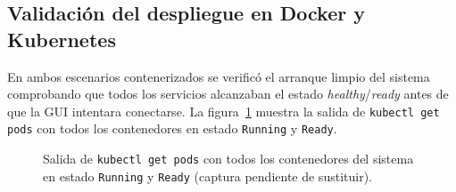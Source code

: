 \subsection{Validación del despliegue en Docker y Kubernetes}

En ambos escenarios contenerizados se verificó el arranque limpio del sistema
comprobando que todos los servicios alcanzaban el estado \textit{healthy}/\textit{ready}
antes de que la GUI intentara conectarse. La figura~\ref{fig:kubectl_pods} muestra
la salida de \texttt{kubectl get pods} con todos los contenedores en estado
\texttt{Running} y \texttt{Ready}.

\begin{figure}[H]
  \centering
  \caption{Salida de \texttt{kubectl get pods} con todos los contenedores
           del sistema en estado \texttt{Running} y \texttt{Ready}
           (captura pendiente de sustituir).}
  \label{fig:kubectl_pods}
\end{figure}
